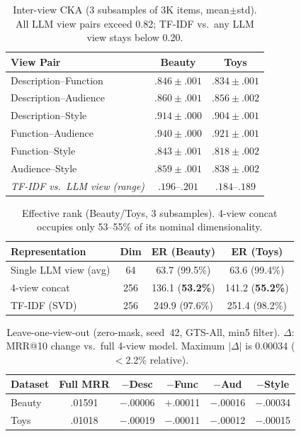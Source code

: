 \documentclass[sigconf,natbib=true,anonymous]{acmart}
\begin{document}
\begin{table}[t]
\centering
\caption{%
Inter-view CKA (3 subsamples of 3K items, mean$\pm$std).
All LLM view pairs exceed 0.82; TF-IDF vs.\ any LLM view stays below 0.20.%
}
\label{tab:cka}
\small
\setlength{\tabcolsep}{4pt}
\begin{tabular}{@{}lcc@{}}
\toprule
View Pair & Beauty & Toys \\
\midrule
Description--Function  & $.846 \pm .001$ & $.834 \pm .001$ \\
Description--Audience  & $.860 \pm .001$ & $.856 \pm .002$ \\
Description--Style     & $.914 \pm .000$ & $.904 \pm .001$ \\
Function--Audience     & $.940 \pm .000$ & $.921 \pm .001$ \\
Function--Style        & $.843 \pm .001$ & $.818 \pm .002$ \\
Audience--Style        & $.859 \pm .001$ & $.838 \pm .002$ \\
\midrule
\emph{TF-IDF vs.\ LLM view (range)} & $.196$--$.201$ & $.184$--$.189$ \\
\bottomrule
\end{tabular}
\end{table}

\begin{table}[t]
\centering
\caption{%
Effective rank (Beauty/Toys, 3 subsamples).
4-view concat occupies only 53--55\% of its nominal dimensionality.%
}
\label{tab:effrank}
\small
\begin{tabular}{@{}lccc@{}}
\toprule
Representation & Dim & ER (Beauty) & ER (Toys) \\
\midrule
Single LLM view (avg) & 64 & 63.7 (99.5\%) & 63.6 (99.4\%) \\
4-view concat & 256 & 136.1 (\textbf{53.2\%}) & 141.2 (\textbf{55.2\%}) \\
TF-IDF (SVD) & 256 & 249.9 (97.6\%) & 251.4 (98.2\%) \\
\bottomrule
\end{tabular}
\end{table}

\begin{table}[t]
\centering
\caption{%
Leave-one-view-out (zero-mask, seed~42, GTS-All, min5 filter).
$\Delta$: MRR@10 change vs.\ full 4-view model.
Maximum $|\Delta|$ is 0.00034 ($<$2.2\% relative).%
}
\label{tab:loov}
\small
\setlength{\tabcolsep}{3.5pt}
\begin{tabular}{@{}lccccc@{}}
\toprule
Dataset & Full MRR & $-$Desc & $-$Func & $-$Aud & $-$Style \\
\midrule
Beauty & .01591 & $-$.00006 & $+$.00011 & $-$.00016 & $-$.00034 \\
Toys   & .01018 & $-$.00019 & $-$.00011 & $-$.00012 & $-$.00015 \\
\bottomrule
\end{tabular}
\end{table}
\end{document}
